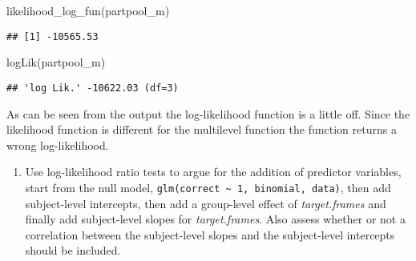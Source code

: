 \documentclass[
]{article}
\newenvironment{Shaded}{\begin{snugshade}}{\end{snugshade}}
\newcommand{\FunctionTok}[1]{\textcolor[rgb]{0.00,0.00,0.00}{#1}}
\newcommand{\NormalTok}[1]{#1}
\providecommand{\tightlist}{%
  \setlength{\itemsep}{0pt}\setlength{\parskip}{0pt}}
\begin{document}
\begin{Shaded}
\begin{Highlighting}[]
\FunctionTok{likelihood\_log\_fun}\NormalTok{(partpool\_m)}
\end{Highlighting}
\end{Shaded}

\begin{verbatim}
## [1] -10565.53
\end{verbatim}

\begin{Shaded}
\begin{Highlighting}[]
\FunctionTok{logLik}\NormalTok{(partpool\_m)}
\end{Highlighting}
\end{Shaded}

\begin{verbatim}
## 'log Lik.' -10622.03 (df=3)
\end{verbatim}

As can be seen from the output the log-likelihood function is a little
off. Since the likelihood function is different for the multilevel
function the function returns a wrong log-likelihood.

\begin{enumerate}
\def\labelenumi{\arabic{enumi})}
\setcounter{enumi}{1}
\tightlist
\item
  Use log-likelihood ratio tests to argue for the addition of predictor
  variables, start from the null model,
  \texttt{glm(correct\ \textasciitilde{}\ 1,\ \textquotesingle{}binomial\textquotesingle{},\ data)},
  then add subject-level intercepts, then add a group-level effect of
  \emph{target.frames} and finally add subject-level slopes for
  \emph{target.frames}. Also assess whether or not a correlation between
  the subject-level slopes and the subject-level intercepts should be
  included.
\end{enumerate}
\end{document}
